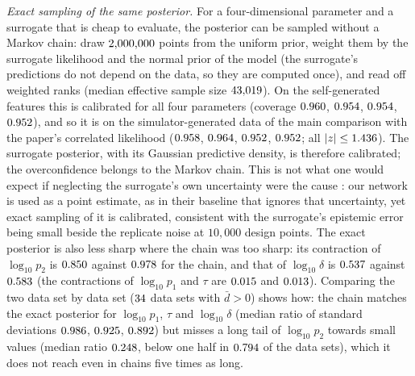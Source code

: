 \documentclass[sn-basic,iicol,pdflatex]{sn-jnl}
\begin{document}
\emph{Exact sampling of the same posterior.} For a four-dimensional parameter and a surrogate that is cheap to evaluate, the posterior can be sampled without a Markov chain: draw $2{,}000{,}000$ points from the uniform
prior, weight them by the surrogate likelihood and the normal prior of the model (the surrogate's predictions do not depend on the data, so they are computed once), and read off weighted ranks
(median effective sample size $43{,}019$). On the self-generated features this is calibrated for all four parameters (coverage $0.960$, $0.954$,
$0.954$, $0.952$), and so it is on the simulator-generated data of the main comparison with the paper's correlated likelihood ($0.958$,
$0.964$, $0.952$, $0.952$; all $|z|\le1.436$). The surrogate posterior, with its Gaussian predictive density, is therefore calibrated;
the overconfidence belongs to the Markov chain. This is not what one would expect if neglecting the surrogate's own uncertainty were the cause \citep{reiser2025}: our network is used as a point estimate, as in their baseline that ignores that uncertainty, yet exact sampling of it is calibrated, consistent with the surrogate's epistemic error being small beside the replicate noise at $10{,}000$ design points. The exact posterior is also less sharp where the chain was too sharp: its contraction of $\log_{10}p_2$ is $0.850$ against $0.978$ for the chain, and that of $\log_{10}\delta$ is $0.537$ against $0.583$ (the contractions of $\log_{10}p_1$ and $\tau$ are $0.015$ and $0.013$). Comparing the two data set by data set ($34$ data sets with $\bar d>0$) shows how: the chain matches the exact posterior for $\log_{10}p_1$, $\tau$ and $\log_{10}\delta$ (median ratio of standard deviations
$0.986$, $0.925$, $0.892$) but misses a long tail of $\log_{10}p_2$ towards small values (median ratio
$0.248$, below one half in $0.794$ of the data sets), which it does not reach even in chains five times as long.
\end{document}
